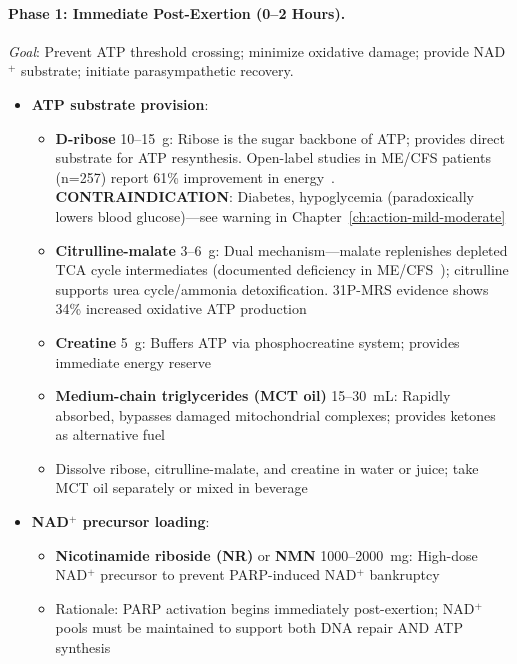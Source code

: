 \paragraph{Phase 1: Immediate Post-Exertion (0--2 Hours).}

\textit{Goal}: Prevent ATP threshold crossing; minimize oxidative damage; provide NAD$^+$ substrate; initiate parasympathetic recovery.

\begin{itemize}
    \item \textbf{ATP substrate provision}:
    \begin{itemize}
        \item \textbf{D-ribose} 10--15~g: Ribose is the sugar backbone of ATP; provides direct substrate for ATP resynthesis. Open-label studies in ME/CFS patients (n=257) report 61\% improvement in energy~\cite{Teitelbaum2012ribose}. \textbf{CONTRAINDICATION}: Diabetes, hypoglycemia (paradoxically lowers blood glucose)---see warning in Chapter~\ref{ch:action-mild-moderate}
        \item \textbf{Citrulline-malate} 3--6~g: Dual mechanism---malate replenishes depleted TCA cycle intermediates (documented deficiency in ME/CFS~\cite{Yamano2016tca_urea}); citrulline supports urea cycle/ammonia detoxification. 31P-MRS evidence shows 34\% increased oxidative ATP production~\cite{Bendahan2002citrulline}
        \item \textbf{Creatine} 5~g: Buffers ATP via phosphocreatine system; provides immediate energy reserve
        \item \textbf{Medium-chain triglycerides (MCT oil)} 15--30~mL: Rapidly absorbed, bypasses damaged mitochondrial complexes; provides ketones as alternative fuel
        \item Dissolve ribose, citrulline-malate, and creatine in water or juice; take MCT oil separately or mixed in beverage
    \end{itemize}

    \item \textbf{NAD$^+$ precursor loading}:
    \begin{itemize}
        \item \textbf{Nicotinamide riboside (NR)} or \textbf{NMN} 1000--2000~mg: High-dose NAD$^+$ precursor to prevent PARP-induced NAD$^+$ bankruptcy
        \item Rationale: PARP activation begins immediately post-exertion; NAD$^+$ pools must be maintained to support both DNA repair AND ATP synthesis
    \end{itemize}


\end{itemize}
